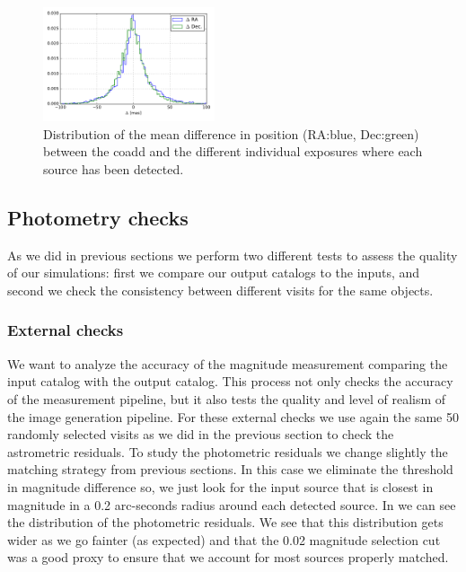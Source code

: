 \documentclass[\docopts]{\docclass}
\begin{document}
\begin{figure}
  \centering
  \includegraphics[width=0.45\textwidth]{astrometry_internal_10visits_imsim_undithered}
  \caption{Distribution of the mean difference in position (RA:blue, Dec:green) between the coadd and the different individual exposures
  where each source has been detected.}
  \label{fig:astrometry_internal}
\end{figure}

\subsection{Photometry checks}
\label{sec:photometry_checks}

As we did in previous sections we perform two different tests to assess the quality of our simulations: first we compare our output catalogs to the inputs, and second we check the consistency between different visits for the same objects.

\subsubsection{External checks}
\label{sec:external_photometry}

We want to analyze the accuracy of the magnitude measurement comparing the input catalog with the output catalog. This process not only checks
the accuracy of the measurement pipeline, but it also tests the quality and level of realism of the image generation pipeline.
For these external checks we use again the same 50 randomly selected visits as we did in the previous section to check the astrometric residuals.
To study the photometric residuals we change slightly the matching strategy from previous sections. In this case we eliminate the threshold
in magnitude difference so, we just look for the input source that is closest in magnitude in a 0.2 arc-seconds radius around each detected
source. In  we can see the distribution of the photometric residuals. We see that this distribution gets wider as we go
fainter (as expected) and that the 0.02 magnitude selection cut was a good proxy to ensure that we account for most sources properly matched.
\end{document}
